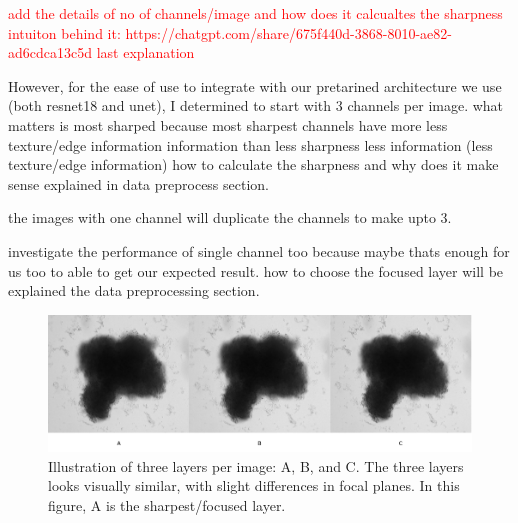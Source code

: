   \textcolor{red}{add the details of no of channels/image and how does it calcualtes the sharpness intuiton behind it: https://chatgpt.com/share/675f440d-3868-8010-ae82-ad6cdca13c5d last explanation}

  However, for the ease of use to integrate with our pretarined architecture we use (both resnet18 and unet),
  I determined to start with 3 channels per image. 
what matters is  most sharped because 
  most sharpest channels have more less texture/edge information information than less sharpness 
 less information (less texture/edge information) 
  how to calculate the sharpness and why does it make sense explained in data preprocess section.

  the images with one channel will duplicate the channels to make upto 3.
  
 
  investigate the performance of single channel too because maybe thats enough for us too to able to get our expected result.
  how to choose the focused layer will be explained the data preprocessing section.

\begin{figure}[H]
  \centering
  \includegraphics[scale=0.46]{figures/threes.png} 
  \caption{Illustration of three layers per image: A, B, and C. The three layers looks visually similar, with slight differences in focal planes. In this figure, A is the sharpest/focused layer.}
  \label{fig:Threes}
\end{figure}

